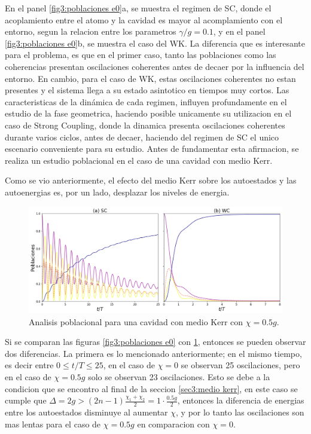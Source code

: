 En el panel \ref{fig3:poblaciones e0}a, se muestra el regimen de SC, donde el acoplamiento entre el atomo y la cavidad es mayor al acomplamiento con el entorno, segun la relacion entre los parametros $\gamma/g=0.1$, y en el panel \ref{fig3:poblaciones e0}b, se muestra el caso del WK. La diferencia que es interesante para el problema, es que en el primer caso, tanto las poblaciones como las coherencias presentan oscilaciones coherentes antes de decaer por la influencia del entorno. En cambio, para el caso de WK, estas oscilaciones coherentes no estan presentes y el sistema llega a su estado asintotico en tiempos muy cortos. Las caracteristicas de la dinámica de cada regimen, influyen profundamente en el estudio de la fase geometrica, haciendo posible unicamente su utilizacion en el caso de Strong Coupling, donde la dinamica presenta oscilaciones coherentes durante varios ciclos, antes de decaer, haciendo del regimen de SC el unico escenario conveniente para su estudio. Antes de fundamentar esta afirmacion, se realiza un estudio poblacional en el caso de una cavidad con medio Kerr.

Como se vio anteriormente, el efecto del medio Kerr sobre los autoestados y las autoenergias es, por un lado, desplazar los niveles de energia.
\begin{figure}
    \centering
    \includegraphics[width=\textwidth]{figuras/ch3/poblaciones kerr.png}
    \caption{Analisis poblacional para una cavidad con medio Kerr con $\chi=0.5g$.}
    \label{fig3:poblaciones kerr}
\end{figure}
Si se comparan las figuras \ref{fig3:poblaciones e0} con \ref{fig3:poblaciones kerr}, entonces se pueden observar dos diferencias. La primera es lo mencionado anteriormente; en el mismo tiempo, es decir entre $0\leq t/T \leq 25$, en el caso de $\chi=0$ se observan 25 oscilaciones, pero en el caso de $\chi=0.5g$ solo se observan 23 oscilaciones. Esto se debe a la condicion que se encontro al final de la seccion \ref{sec3:medio kerr}, en este caso se cumple que $\Delta=2g>(2n-1)\frac{\chi_1+\chi_2}{2}=1\cdot\frac{0.5g}{2}$, entonces la diferencia de energias entre los autoestados disminuye al aumentar $\chi$, y por lo tanto las oscilaciones son mas lentas para el caso de $\chi=0.5g$ en comparacion con $\chi=0$.

